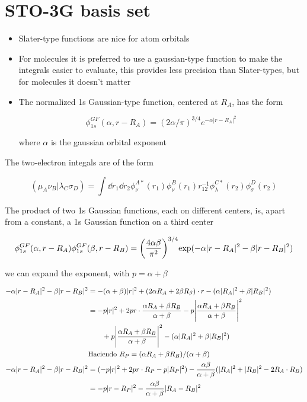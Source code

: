 \documentclass[11pt]{article}
\begin{document}
\section{STO-3G basis set}
\label{sec:org3efa7ca}

\begin{itemize}
\item Slater-type functions are nice for atom orbitals

\item For molecules it is preferred to use a gaussian-type function to make the integrals easier to evaluate, this provides less precision than Slater-types, but for molecules it doesn't matter

\item The normalized 1s Gaussian-type function, centered at \(R_A\), has the form

\[ \phi_{1s}^{GF} (\alpha, r-R_A) = (2\alpha/\pi)^{3/4} e^{-\alpha|r-R_A|^2} \]

where \(\alpha\) is the gaussian orbital exponent
\end{itemize}

The two-electron integals are of the form

\[ (\mu_A\nu_B|\lambda_C\sigma_D) = \int \dd{r_1}\dd{r_2} \phi_{\nu}^{A * }(r_1)\phi_{\nu}^B(r_1)r_{12}^{-1}\phi_{\lambda}^{C * }(r_2)\phi_{\sigma}^D(r_2) \]

The product of two 1s Gaussian functions, each on different centers, is, apart from a constant, a 1s Gaussian function on a third center

\begin{align*}
    \phi_{1s}^{GF}(\alpha, r-R_A)\phi_{1s}^{GF}(\beta,r-R_B) = \qty(\frac{4\alpha\beta}{\pi^2})^{3/4} \text{exp}(-\alpha|r-R_A|^2 - \beta|r-R_B|^2)
\end{align*}

we can expand the exponent, with \(p=\alpha+\beta\)

\begin{align*}
    -\alpha|r-R_A|^2 - \beta|r-R_B|^2 &= -(\alpha+\beta)|r|^2 + (2\alpha R_A+2\beta R_{\beta})\cdot r - (\alpha|R_A|^2 + \beta|R_B|^2) \\
    &= -p|r|^2 + 2pr \cdot \frac{\alpha R_A+\beta R_B}{\alpha+\beta} - p \Bigg| \frac{\alpha R_A + \beta R_B}{\alpha+\beta} \Bigg|^2 \\
    & \qq{} + p\Bigg| \frac{\alpha R_A + \beta R_B}{\alpha+\beta} \Bigg|^2 - (\alpha |R_A|^2 + \beta |R_B|^2) \\
    & \text{Haciendo }  R_P = (\alpha R_A + \beta R_B)/(\alpha+\beta)  \\
    -\alpha |r-R_A|^2 - \beta|r-R_B|^2 &= (-p|r|^2 + 2pr \cdot R_P - p |R_P|^2)- \frac{\alpha\beta}{\alpha+\beta} (|R_A|^2 + |R_B|^2 - 2R_A \cdot R_B) \\
    &= - p |r-R_P|^2 - \frac{\alpha\beta}{\alpha+\beta}|R_A-R_B|^2
\end{align*}
\end{document}
